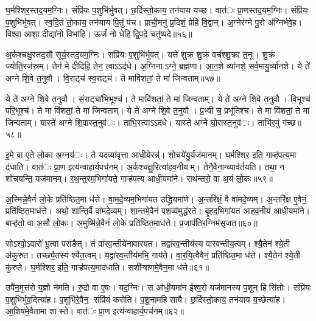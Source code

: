 घ॒र्मश्शिर॒स्तद॒यम॒ग्निः। संप्रि॑यः प॒शुभि॑र्भुवत्। छ॒र्दिस्तो॒काय॒ तन॑याय यच्छ। वात॑ः प्रा॒णस्तद॒यम॒ग्निः। संप्रि॑यः प॒शुभि॑र्भुवत्। स्व॒दि॒तं तो॒काय॒ तन॑याय पि॒तुं प॑च। प्राची॒मनु॑ प्र॒दिशं॒ प्रेहि॑ वि॒द्वान्। अ॒ग्नेर॑ग्ने पु॒रो अ॑ग्निर्भवे॒ह। विश्वा॒ आशा॒ दीद्या॑नो॒ विभा॑हि। ऊर्जं॑ नो धेहि द्वि॒पदे॒ चतु॑ष्पदे॥५६॥

अ॒र्कश्चक्षु॒स्तद॒सौ सूर्य॒स्तद॒यम॒ग्निः। संप्रि॑यः प॒शुभि॑र्भुवत्। यत्ते॑ शुक्र शु॒क्रं वर्च॑श्शु॒क्रा त॒नूः। शु॒क्रं ज्योति॒रज॑स्रम्। तेन॑ मे दीदिहि॒ तेन॒ त्वाऽऽद॑धे। अ॒ग्निनाऽग्ने॒ ब्रह्म॑णा। आ॒न॒शे व्या॑नशे॒ सर्व॒मायु॒र्व्या॑नशे। ये ते॑ अग्ने शि॒वे त॒नुवौ। वि॒राट्च॑ स्व॒राट्च॑। ते मावि॑शतां॒ ते मा॑ जिन्वताम्॥५७॥

ये ते॑ अग्ने शि॒वे त॒नुवौ। सं॒राट्चा॑भि॒भूश्च॑। ते मावि॑शतां॒ ते मा॑ जिन्वताम्। ये ते॑ अग्ने शि॒वे त॒नुवौ। वि॒भूश्च॑ परि॒भूश्च॑। ते मा वि॑शतां॒ ते मा॑ जिन्वताम्। ये ते॑ अग्ने शि॒वे त॒नुवौ। प्र॒भ्वी च॒ प्रभू॑तिश्च। ते मा वि॑शतां॒ ते मा॑ जिन्वताम्। यास्ते॑ अग्ने शि॒वास्त॒नुव॑ः। ताभि॒स्त्वाऽऽद॑धे। यास्ते॑ अग्ने घो॒रास्त॒नुव॑ः। ताभि॑र॒मुं ग॑च्छ॥५८॥\anuvakamend[चतु॑ष्पदे जिन्वतां त॒नुव॒स्त्रीणि॑ च]

इ॒मे वा ए॒ते लो॒का अ॒ग्नय॑ः। ते यदव्या॑वृत्ता आधी॒येरन्न्॑। शो॒चये॑यु॒र्यज॑मानम्। घ॒र्मश्शिर॒ इति॒ गाऱ्ह॑पत्य॒मा द॑धाति। वात॑ः प्रा॒ण इत्य॑न्वाहार्य॒पच॑नम्। अ॒र्कश्चक्षु॒रित्या॑हव॒नीयम्। तेनै॒वैना॒न्व्याव॑र्तयति। तथा॒ न शो॑चयन्ति॒ यज॑मानम्। र॒थ॒न्त॒रम॒भिगा॑यते॒ गाऱ्ह॑पत्य आधी॒यमा॑ने। राथ॑न्तरो॒ वा अ॒यं लो॒कः॥५९॥

अ॒स्मिन्ने॒वैनं॑ लो॒के प्रति॑ष्ठित॒मा ध॑त्ते। वा॒म॒दे॒व्यम॒भिगा॑यत उद्ध्रि॒यमा॑णे। अ॒न्तरि॑क्षं॒ वै वा॑मदे॒व्यम्। अ॒न्तरि॑क्ष ए॒वैनं॒ प्रति॑ष्ठित॒माध॑त्ते। अथो॒ शान्ति॒र्वै वा॑मदे॒व्यम्। शा॒न्तमे॒वैनं॑ पश॒व्य॑मुद्ध॑रते। बृ॒हद॒भिगा॑यत आहव॒नीय॑ आधी॒यमा॑ने। बाऱ्ह॑तो॒ वा अ॒सौ लो॒कः। अ॒मुष्मि॑न्ने॒वैनं॑ लो॒के प्रति॑ष्ठित॒माध॑त्ते। प्र॒जाप॑तिर॒ग्निम॑सृजत॥६०॥

सोऽश्वो॒ऽवारो॑ भू॒त्वा परा॑ङैत्। तं वा॑रव॒न्तीये॑नावारयत। तद्वा॑रव॒न्तीय॑स्य वारवन्तीय॒त्वम्। श्यै॒तेन॑ श्ये॒ती अ॑कुरुत। तच्छ्यै॒तस्य॑ श्यैत॒त्वम्। यद्वा॑रव॒न्तीय॑मभि॒ गाय॑ते। वा॒र॒यि॒त्वैवैनं॒ प्रति॑ष्ठित॒मा ध॑त्ते। श्यै॒तेन॑ श्ये॒ती कु॑रुते। घ॒र्मश्शिर॒ इति॒ गाऱ्ह॑पत्य॒माद॑धाति। सशी॑ऱ्षाणमे॒वैन॒मा ध॑त्ते॥६१॥

उपै॑न॒मुत्त॑रो य॒ज्ञो न॑मति। रु॒द्रो वा ए॒षः। यद॒ग्निः। स आ॑धी॒यमा॑न ईश्व॒रो यज॑मानस्य प॒शून् हिसि॑तोः। संप्रि॑यः प॒शुभि॑र्भुव॒दित्या॑ह। प॒शुभि॑रे॒वैन॒ संप्रि॑यं करोति। प॒शू॒नामहिसायै। छ॒र्दिस्तो॒काय॒ तन॑याय य॒च्छेत्या॑ह। आ॒शिष॑मे॒वैतामा शास्ते। वात॑ः प्रा॒ण इत्य॑न्वाहार्य॒पच॑नम्॥६२॥


